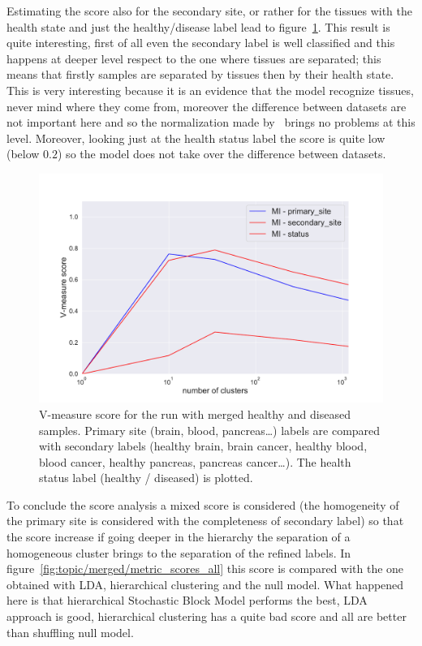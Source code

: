 Estimating the score also for the secondary site, or rather for the tissues with the health state and just the healthy/disease label lead to figure~\ref{fig:topic/merged/metric_scores}. This result is quite interesting, first of all even the secondary label is well classified and this happens at deeper level respect to the one where tissues are separated; this means that firstly samples are separated by tissues then by their health state. This is very interesting because it is an evidence that the model recognize tissues, never mind where they come from, moreover the difference between datasets are not important here and so the normalization made by~\cite{Betel2018} brings no problems at this level. Moreover, looking just at the health status label the score is quite low (below $0.2$) so the model does not take over the difference between datasets.
\begin{figure}[htb!]
    \centering
    \includegraphics[width=0.8\linewidth]{pictures/topic/merged/metric_scores.pdf}
    \caption{V-measure score for the run with merged healthy and diseased samples. Primary site (brain, blood, pancreas\ldots) labels are compared with secondary labels (healthy brain, brain cancer, healthy blood, blood cancer, healthy pancreas, pancreas cancer\ldots). The health status label (healthy / diseased) is plotted.}
    \label{fig:topic/merged/metric_scores}
\end{figure}
To conclude the score analysis a mixed score is considered (the homogeneity of the primary site is considered with the completeness of secondary label) so that the score increase if going deeper in the hierarchy the separation of a homogeneous cluster brings to the separation of the refined labels. In figure~\ref{fig:topic/merged/metric_scores_all} this score is compared with the one obtained with LDA, hierarchical clustering and the null model. What happened here is that hierarchical Stochastic Block Model performs the best, LDA approach is good, hierarchical clustering has a quite bad score and all are better than shuffling null model.
